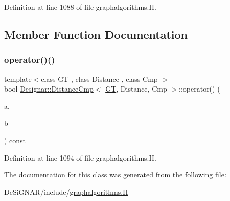 Definition at line 1088 of file graphalgorithms.\+H.



\subsection{Member Function Documentation}
\mbox{\label{class_designar_1_1_distance_cmp_a5de92b27c64e3493d950a99018d28671}} 
\subsubsection{\texorpdfstring{operator()()}{operator()()}}
{\footnotesize\ttfamily template$<$class GT , class Distance , class Cmp $>$ \\
bool \hyperlink{class_designar_1_1_distance_cmp}{Designar\+::\+Distance\+Cmp}$<$ \hyperlink{demo-buildgraph_8_c_a3001c40d2c31ca87ed96cd7d1334a55e}{GT}, Distance, Cmp $>$\+::operator() (\begin{DoxyParamCaption}\item[{typename G\+T\+::\+Arc \&}]{a,  }\item[{typename G\+T\+::\+Arc \&}]{b }\end{DoxyParamCaption}) const\hspace{0.3cm}{\ttfamily [inline]}}



Definition at line 1094 of file graphalgorithms.\+H.



The documentation for this class was generated from the following file\+:\begin{DoxyCompactItemize}
\item 
De\+Si\+G\+N\+A\+R/include/\hyperlink{graphalgorithms_8_h}{graphalgorithms.\+H}\end{DoxyCompactItemize}
